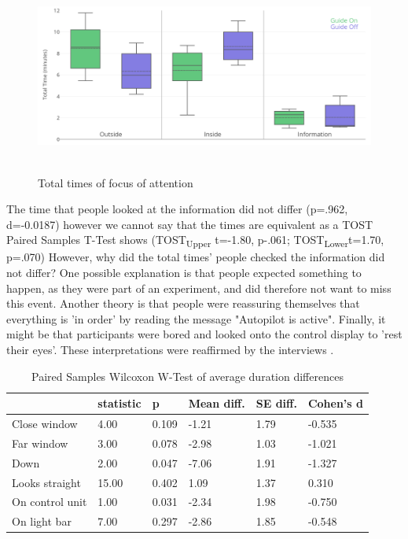 \begin{figure}
    \includegraphics[width=1\textwidth]{fig/Total.png}\hfill\
    \caption[Times of Attention]{Total times of focus of attention}
    \label{fig:attentionTotal}
\end{figure}

The time that people looked at the information did not differ (p=.962, d=-0.0187) however we cannot say that the times are equivalent as a TOST \cite{Details2012EquivalenceProportions} Paired Samples T-Test shows
(TOST\textsubscript{Upper} t=-1.80, p-.061; TOST\textsubscript{Lower}t=1.70, p=.070)
However, why did the total times' people checked the information did not differ? One possible explanation is that people expected something to happen, as they were part of an experiment, and did therefore not want to miss this event. Another theory is that people were reassuring themselves that everything is 'in order' by reading the message "Autopilot is active". Finally, it might be that participants were bored and looked onto the control display to 'rest their eyes'. These interpretations were reaffirmed by the interviews . 

\begin{table}[]
\label{tab:averageVideo}
  \caption{Paired Samples Wilcoxon W-Test of average duration differences}
\begin{tabular}{@{}llllll@{}}
\toprule
 & statistic & p & Mean diff. & SE diff. & Cohen's d \\ \midrule
Close window & 4.00 & 0.109 & -1.21 & 1.79 & -0.535 \\
Far window & 3.00 & 0.078 & -2.98 & 1.03 & -1.021 \\
Down & 2.00 & 0.047 & -7.06 & 1.91 & -1.327 \\
Looks straight & 15.00 & 0.402 & 1.09 & 1.37 & 0.310 \\
On control unit & 1.00 & 0.031 & -2.34 & 1.98 & -0.750 \\
On light bar & 7.00 & 0.297 & -2.86 & 1.85 & -0.548 \\ \bottomrule
\end{tabular}
\end{table}

